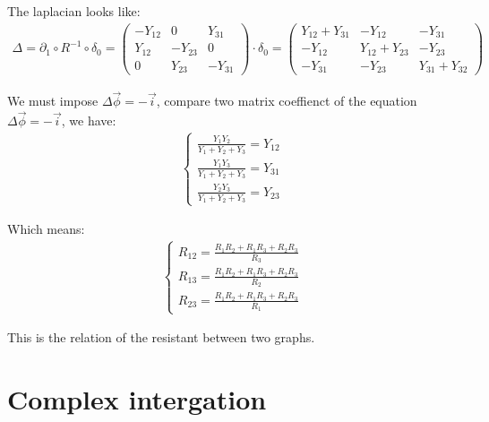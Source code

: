 \documentclass[]{ctexart}
\begin{document}
		The laplacian looks like:
			\begin{equation*}
			\begin{aligned}
				\Delta=\partial_{1} \circ R^{-1} \circ \delta_{0}=\left(\begin{array}{ccc}
				-Y_{12} & 0 & Y_{31} \\
				Y_{12} & -Y_{23} & 0 \\
				0 & Y_{23} & -Y_{31}
				\end{array}\right) \cdot \delta_{0}=\left(\begin{array}{cccc}
				Y_{12}+Y_{31} & -Y_{12} & -Y_{31} \\
				-Y_{12} & Y_{12}+Y_{23} & -Y_{23} \\
				-Y_{31} & -Y_{23} & Y_{31}+Y_{32}
				\end{array}\right)
			\end{aligned}
			\end{equation*}
			
		We must impose $\Delta \vec{\phi}=-\vec{i}$, compare two matrix coeffienct of the equation $\Delta \vec{\phi}=-\vec{i}$, we have:
			\begin{equation*}
			\begin{aligned}
				\begin{cases}
					\frac{Y_{1} Y_{2}}{Y_{1}+Y_{2}+Y_{3}}=Y_{12}\\
					\frac{Y_{1} Y_{3}}{Y_{1}+Y_{2}+Y_{3}}=Y_{31} \\
					\frac{Y_{2} Y_{3}}{Y_{1}+Y_{2}+Y_{3}}=Y_{23}
				\end{cases}
			\end{aligned}
			\end{equation*}
			
		Which means:
			\begin{equation*}
			\begin{aligned}
				\left\{\begin{array}{l}
				R_{12}=\frac{R_{1} R_{2}+R_{1} R_{3}+R_{2} R_{3}}{R_{3}} \\
				R_{13}=\frac{R_{1} R_{2}+R_{1} R_{3}+R_{2} R_{3}}{R_{2}} \\
				R_{23}=\frac{R_{1} R_{2}+R_{1} R_{3}+R_{2} R_{3}}{R_{1}}
				\end{array}\right.
			\end{aligned}
			\end{equation*}
		
		This is the relation of the resistant between two graphs. 
		
\section{Complex intergation}
\end{document}
